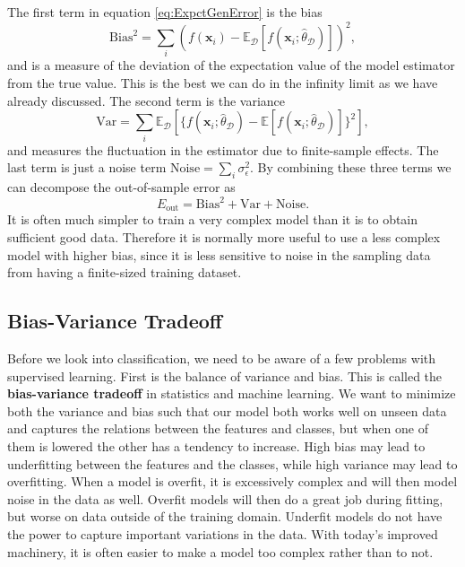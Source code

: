 \documentclass[a4paper, american, 12pt]{report}
\begin{document}
	The first term in equation \ref{eq:ExpctGenError} is the bias
	\begin{equation}
	\label{eq:Bias}
		\text{Bias}^2=\sum_i (f(\textbf{x}_i)-\mathds{E}_{\mathcal{D}}[f(\textbf{x}_i;\hat{\theta}_{\mathcal{D}})])^2,
	\end{equation}
	and is a measure of the deviation of the expectation value of the model estimator from the true value. This is the best we can do in the infinity limit as we have already discussed. The second term is the variance 
	\begin{equation}
	\label{eq:Variance}
		\text{Var}= \sum_i \mathds{E}_{\mathcal{D}}[\{f(\textbf{x}_i;\hat{\theta}_{\mathcal{D}})-\mathds{E}[f(\textbf{x}_i;\hat{\theta}_{\mathcal{D}})]\}^2], 
	\end{equation}
	and measures the fluctuation in the estimator due to finite-sample effects. The last term is just a noise term $\text{Noise}=\sum_{i}\sigma_{\epsilon}^2$. By combining these three terms we can decompose the out-of-sample error as
	\begin{equation}
	\label{eq:OutOfSampleError}
		E_{\text{out}}=\text{Bias}^2+\text{Var}+\text{Noise}.
	\end{equation}
	It is often much simpler to train a very complex model than it is to obtain sufficient good data. Therefore it is normally more useful to use a less complex model with higher bias, since it is less sensitive to noise in the sampling data from having a finite-sized training dataset.
	
	
	\subsection{Bias-Variance Tradeoff}
	\label{subsect:Theory-BiasVarianceTradeoff}
	Before we look into classification, we need to be aware of a few problems with supervised learning. First is the balance of variance and bias. This is called the \textbf{bias-variance tradeoff} in statistics and machine learning. We want to minimize both the variance and bias such that our model both works well on unseen data and captures the relations between the features and classes, but when one of them is lowered the other has a tendency to increase. High bias may lead to underfitting between the features and the classes, while high variance may lead to overfitting. When a model is overfit, it is excessively complex and will then model noise in the data as well. Overfit models will then do a great job during fitting, but worse on data outside of the training domain. Underfit models do not have the power to capture important variations in the data. With today's improved machinery, it is often easier to make a model too complex rather than to not.
	
\end{document}
